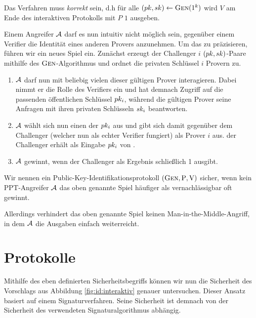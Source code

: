 Das Verfahren muss \emph{korrekt} sein, d.h für alle $(pk, sk)
\leftarrow \textsc{Gen}(1^k)$ wird $V$ am Ende des interaktiven Protokolls mit
$P$ $1$ ausgeben. 

Einem Angreifer $\mathcal{A}$ darf es nun intuitiv nicht möglich sein, gegenüber
einem Verifier die Identität eines anderen Provers anzunehmen. Um das zu
präzisieren, führen wir ein neues Spiel ein. Zunächst erzeugt der Challenger $i$
$(pk, sk)$-Paare mithilfe des $\textsc{Gen}$-Algorithmus und ordnet die privaten Schlüssel $i$ Provern zu.
\begin{enumerate}
  \item $\mathcal{A}$ darf nun mit beliebig vielen dieser gültigen Prover
    interagieren. Dabei nimmt er die Rolle des Verifiers ein und hat demnach
    Zugriff auf die passenden öffentlichen Schlüssel $pk_i$, während die
    gültigen Prover seine Anfragen mit ihren privaten Schlüsseln $sk_i$
    beantworten.
  \item $\mathcal{A}$ wählt sich nun einen der $pk_{i}$ aus und gibt sich
    damit gegenüber dem Challenger (welcher nun als \glqq echter\grqq{}
    Verifier fungiert) als Prover $i$ aus. der Challenger erhält als
    Eingabe $pk_i$ von \A.
  \item $\mathcal{A}$ gewinnt, wenn der Challenger als Ergebnis schließlich 1
ausgibt.
\end{enumerate} Wir nennen ein Public-Key-Identifikationsprotokoll
$(\textsc{Gen}, \mathrm{P}, \mathrm{V})$ sicher, wenn kein PPT-Angreifer $\mathcal{A}$
das oben genannte Spiel häufiger als vernachlässigbar oft gewinnt.

Allerdings verhindert das oben genannte Spiel keinen
Man-in-the-Middle-Angriff, in dem $\mathcal{A}$ die Ausgaben einfach
weiterreicht.

\section{Protokolle}\label{sec:id:protokolle}
Mithilfe des eben definierten Sicherheitsbegriffs können wir nun die
Sicherheit des Vorschlags aus Abbildung \ref{fig:id:interaktiv} genauer untersuchen.
Dieser Ansatz basiert auf einem Signaturverfahren. Seine
Sicherheit ist demnach von der Sicherheit des verwendeten
Signaturalgorithmus abhängig.

